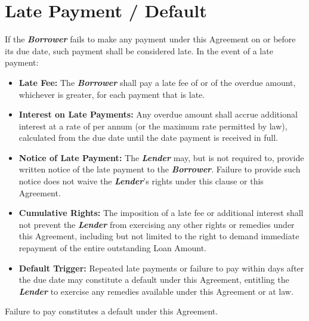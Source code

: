 
\section{Late Payment / Default}
\label{sec:late}

If the \textbf{\textit{Borrower}} fails to make any payment under this Agreement on or before its due date, such payment shall be considered late. In the event of a late payment:

\begin{itemize}
  \item \textbf{Late Fee:} The \textbf{\textit{Borrower}} shall pay a late fee of \LoanLateFee{} or \LoanLateFeeInterest{} of the overdue amount, whichever is greater, for each payment that is late.
  \item \textbf{Interest on Late Payments:} Any overdue amount shall accrue additional interest at a rate of \LoanLateFeeInterest{} per annum (or the maximum rate permitted by law), calculated from the due date until the date payment is received in full.
  \item \textbf{Notice of Late Payment:} The \textbf{\textit{Lender}} may, but is not required to, provide written notice of the late payment to the \textbf{\textit{Borrower}}. Failure to provide such notice does not waive the \textbf{\textit{Lender}}’s rights under this clause or this Agreement.
  \item \textbf{Cumulative Rights:} The imposition of a late fee or additional interest shall not prevent the \textbf{\textit{Lender}} from exercising any other rights or remedies under this Agreement, including but not limited to the right to demand immediate repayment of the entire outstanding Loan Amount.
  \item \textbf{ Default Trigger:} Repeated late payments or failure to pay within \LoanRepaymentDeadline{} days after the due date may constitute a default under this Agreement, entitling the \textbf{\textit{Lender}} to exercise any remedies available under this Agreement or at law.
\end{itemize}

\noindent Failure to pay constitutes a default under this Agreement.

